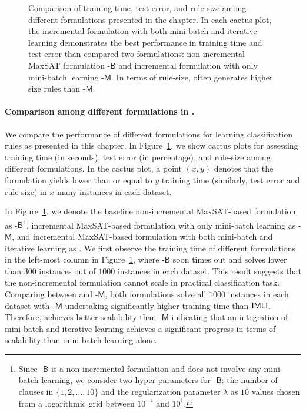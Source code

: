 \begin{figure}
	
	\caption[Training time, test error, and rule-size of different formulations in {\imli}]{Comparison of training time, test error, and rule-size among different formulations presented in the chapter. In each cactus plot, the incremental formulation {\imli} with both mini-batch and iterative learning demonstrates the best performance in training time and test error than compared two formulations: non-incremental MaxSAT formulation {\imli}-$\mathsf{B}$ and incremental formulation with only mini-batch learning {\imli}-$\mathsf{M}$. In terms of rule-size, {\imli} often generates higher size rules than {\imli}-$\mathsf{M}$.}
	\label{interpretability_imli_fig:different_formulations}
\end{figure}



\paragraph{Comparison among different formulations in {\imli}.}  We compare the performance of different formulations for learning classification rules as presented in this chapter. In Figure~\ref{interpretability_imli_fig:different_formulations}, we show cactus plots for assessing training time (in seconds), test error (in percentage), and rule-size among different formulations. In the cactus plot, a point $ (x,y) $ denotes that the formulation yields lower than or equal to $ y $ training time (similarly, test error and rule-size) in $ x $ many instances in each dataset.

In Figure~\ref{interpretability_imli_fig:different_formulations}, we denote the baseline non-incremental MaxSAT-based formulation as {\imli}-$\mathsf{B}$\footnote{Since  {\imli}-$\mathsf{B}$ is a non-incremental formulation and does not involve any mini-batch learning, we consider two hyper-parameters for {\imli}-$\mathsf{B}$: the number of clauses in $ \{1, 2, \dots, 10\} $ and the regularization parameter $ \lambda $ as $ 10 $ values chosen from a logarithmic grid between $ 10^{-4} $ and $ 10^1 $.}, incremental MaxSAT-based formulation with only mini-batch learning as {\imli}-$\mathsf{M}$, and incremental MaxSAT-based formulation with both mini-batch and iterative learning as {\imli}.  We first observe the training time of different formulations in the left-most column in Figure~\ref{interpretability_imli_fig:different_formulations}, where {\imli}-$\mathsf{B}$ soon times out and solves lower than $ 300 $ instances out of $ 1000 $ instances in each dataset. This result suggests that the non-incremental formulation cannot scale in practical classification task. Comparing between {\imli} and {\imli}-$\mathsf{M}$, both formulations solve all $ 1000 $ instances in each dataset with {\imli}-$\mathsf{M}$ undertaking significantly higher training time than $ {\mathsf{IMLI}} $.  Therefore, {\imli} achieves better scalability than {\imli}-$\mathsf{M}$ indicating that an integration of mini-batch and iterative learning achieves a significant progress in terms of scalability than mini-batch learning alone. 

